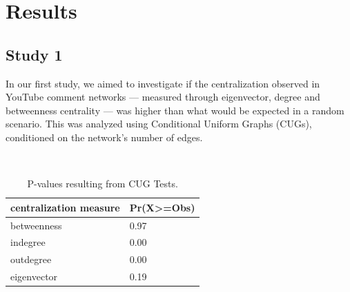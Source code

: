 \documentclass[
  man,floatsintext]{apa6}
\begin{document}
\section{\texorpdfstring{Results\\
}{Results }}\label{results}

\subsection{\texorpdfstring{Study 1\\
}{Study 1 }}\label{study-1}

In our first study, we aimed to investigate if the centralization observed in YouTube comment networks --- measured through eigenvector, degree and betweenness centrality --- was higher than what would be expected in a random scenario. This was analyzed using Conditional Uniform Graphs (CUGs), conditioned on the network's number of edges.\\
\strut \\


\begin{table}[h]

\begin{center}
\begin{threeparttable}

\caption{\label{tab:cug-results-table}P-values resulting from CUG Tests.}

\begin{tabular}{ll}
\toprule
centralization measure & \multicolumn{1}{c}{Pr(X>=Obs)}\\
\midrule
betweenness & 0.97\\
indegree & 0.00\\
outdegree & 0.00\\
eigenvector & 0.19\\
\bottomrule
\end{tabular}

\end{threeparttable}
\end{center}

\end{table}
\end{document}
